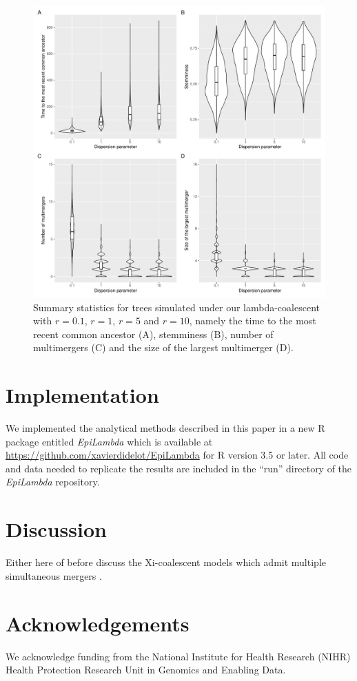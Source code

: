 \documentclass{article}
\begin{document}
\begin{figure}[!t]
\begin{center}
\includegraphics[width=15cm]{../run/figureStats.pdf}
\end{center}
\caption{Summary statistics for trees simulated under our lambda-coalescent with $r=0.1$, $r=1$, $r=5$ and $r=10$, namely the time to the most recent common ancestor (A), stemminess (B), number of multimergers (C) and the size of the largest multimerger (D).
\label{fig:stats}}
\end{figure}



\section{Implementation}

We implemented the analytical methods described in this paper in a 
new R package entitled \emph{EpiLambda} which is available
at \url{https://github.com/xavierdidelot/EpiLambda} for R version 3.5 or later. 
All code and data needed to replicate the results are included in the ``run'' directory of the \emph{EpiLambda} repository.

\section{Discussion}

Either here of before discuss the Xi-coalescent models which admit multiple 
simultaneous mergers \citep{schweinsbergCoalescentsSimultaneousMultiple2000}.

\section*{Acknowledgements}

We acknowledge funding from the National Institute for Health Research (NIHR) Health Protection Research Unit in Genomics and Enabling Data.

\newpage

%

\end{document}
